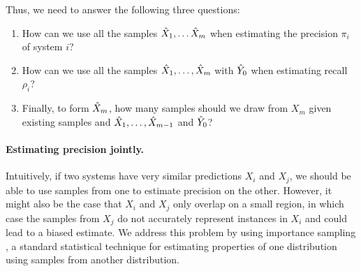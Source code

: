 Thus, we need to answer the following three questions:
\begin{enumerate}
  \item How can we use all the samples ${\hat{X}}_1, \ldots {\hat{X}}_m$ when estimating the precision $\pi_i$ of system $i$?
  \item How can we use all the samples ${\hat{X}}_1, \ldots, {\hat{X}}_m$ with ${\hat{Y}}_0$ when estimating recall $\rho_i$?
  \item Finally, to form ${\hat{X}}_m$, how many samples should we draw from $X_m$ given existing samples and ${\hat{X}}_1, \ldots, {\hat{X}}_{m-1}$ and ${\hat{Y}}_0$?
\end{enumerate}
%
%
%

\paragraph{Estimating precision jointly.}
Intuitively, if two systems have very similar predictions $X_i$ and $X_j$, we should be able to use samples from one to estimate precision on the other.
However, it might also be the case that $X_i$ and $X_j$ only overlap on a small region, in which case the samples from $X_j$ do not accurately represent instances in $X_i$ and could lead to a biased estimate.
We address this problem by using importance sampling \citep{owen2013monte}, a standard statistical technique for estimating properties of one distribution using samples from another distribution.


